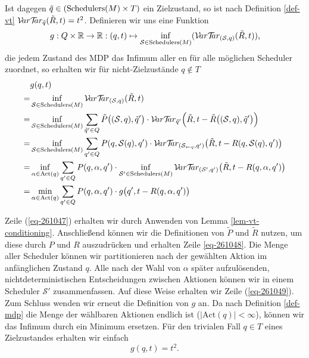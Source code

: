 \documentclass[a4paper]{article}
\theoremstyle{nonumberplain}
\begin{document}
	Ist dagegen $\tilde{q} \in  (\mathrm{Schedulers}(M) \times T)$ ein Zielzustand, so ist nach Definition \ref{def-vt} $\mathcal{V}\!ar \mathcal{T}\!\!ar_{\tilde{q}}(\tilde{R},t) = t^2$.
	Definieren wir uns eine Funktion
	\begin{equation}
	g : Q \times \mathbb{R} \to \mathbb{R} : (q,t) \mapsto \inf_{\mathcal{S} \in \mathrm{Schedulers}(M)}(\mathcal{V}\!ar \mathcal{T}\!\!ar_{(\mathcal{S},q)}(\tilde{R},t))\text{,}
	\end{equation}
	die jedem Zustand des MDP \mdpex{} das Infimum aller \vt{}en für alle möglichen Scheduler zuordnet, so erhalten wir für nicht-Zielzustände $q\notin T$
	\begin{align}
	&g(q,t)\\
	=& \inf_{\mathcal{S} \in \mathrm{Schedulers}(M)}\mvt_{(\mathcal{S},q)}(\tilde{R},t) \\
	=& \inf_{\mathcal{S} \in \mathrm{Schedulers}(M)}\sum_{\tilde{q}' \in Q} \tilde{P}\big((\mathcal{S},q),\tilde{q}'\big) \cdot \mvt_{\tilde{q}'}\Big(\tilde{R},t -\tilde{R}\big((\mathcal{S},q),\tilde{q}'\big)\Big) \label{eq-261047}\\
	=& \inf_{\mathcal{S} \in \mathrm{Schedulers}(M)}\sum_{q' \in Q} P(q,\mathcal{S}(q),q') \cdot \mvt_{(\mathcal{S}_{\leftarrow q},q')}\big(\tilde{R},t -R(q,\mathcal{S}(q),q')\big)\label{eq-261048}\\%
	=& \inf_{\alpha \in \mathrm{Act}(q)}\sum_{q' \in Q} P(q,\alpha,q') \cdot \inf_{\mathcal{S'} \in \mathrm{Schedulers}(M)} \mvt_{(\mathcal{S'},q')}\big(\tilde{R},t -R(q,\alpha,q')\big)\label{eq-261049}\\%
	=& \min_{\alpha \in \mathrm{Act}(q)}\sum_{q' \in Q} P(q,\alpha,q') \cdot g\big(q',t -R(q,\alpha,q')\big)\label{eq-grec}
	\end{align}
	
	Zeile (\ref{eq-261047}) erhalten wir durch Anwenden von Lemma \ref{lem-vt-conditioning}. Anschließend können wir die Definitionen von $\tilde{P}$ und $\tilde{R}$ nutzen, um diese durch $P$ und $R$ auszudrücken und erhalten Zeile \ref{eq-261048}. Die Menge aller Scheduler können wir partitionieren nach der gewählten Aktion im anfänglichen Zustand $q$. Alle nach der Wahl von $\alpha$ später aufzulösenden, nichtdeterministischen Entscheidungen zwischen Aktionen können wir in einem Scheduler $\mathcal{S'}$ zusammenfassen. Auf diese Weise erhalten wir Zeile (\ref{eq-261049}). Zum Schluss wenden wir erneut die Definition von $g$ an. Da nach Definition \ref{def-mdp} die Menge der wählbaren Aktionen endlich ist ($|\mathrm{Act}(q)| < \infty$), können wir das Infimum durch ein Minimum ersetzen.
	Für den trivialen Fall $q\in T$ eines Zielzustandes erhalten wir einfach
	\begin{equation}\label{eq-gt2}
	g(q,t) = t^2\text{.}
	\end{equation}
	
\end{document}
